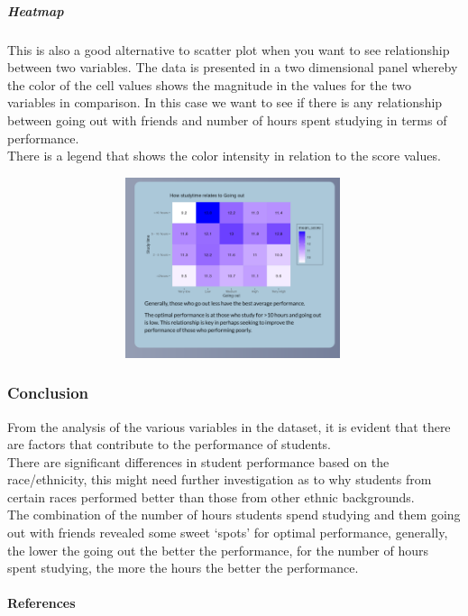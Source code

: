 \documentclass[
]{article}
\begin{document}
\hypertarget{heatmap}{%
\subparagraph{Heatmap}\label{heatmap}}

This is also a good alternative to scatter plot when you want to see
relationship between two variables. The data is presented in a two
dimensional panel whereby the color of the cell values shows the
magnitude in the values for the two variables in comparison. In this
case we want to see if there is any relationship between going out with
friends and number of hours spent studying in terms of performance.\\
There is a legend that shows the color intensity in relation to the
score values.

\includegraphics[width=5.20833in,height=2.08333in]{www/heatmap.png}

\hypertarget{conclusion-1}{%
\subsubsection{Conclusion}\label{conclusion-1}}

From the analysis of the various variables in the dataset, it is evident
that there are factors that contribute to the performance of students.\\
There are significant differences in student performance based on the
race/ethnicity, this might need further investigation as to why students
from certain races performed better than those from other ethnic
backgrounds.\\
The combination of the number of hours students spend studying and them
going out with friends revealed some sweet `spots' for optimal
performance, generally, the lower the going out the better the
performance, for the number of hours spent studying, the more the hours
the better the performance.

\hypertarget{references}{%
\paragraph{References}\label{references}}
\end{document}

